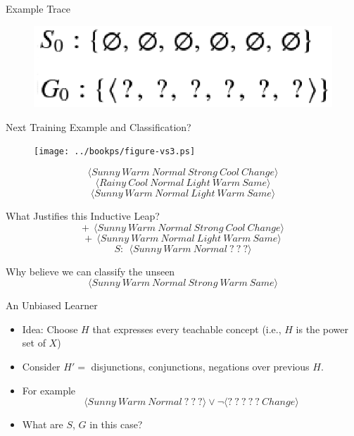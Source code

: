 \documentclass[%
pdf,
colorBG,
slideColor,
tcrico,
]{prosper}
\begin{document}
\begin{slide}{Example Trace}
\begin{figure}
	\centering
	\includegraphics[scale=0.4]{exampleTrace.eps}
\end{figure}
\end{slide}


\begin{slide}{Next Training Example and Classification?}
\begin{figure}
	\centering
	\texttt{[image: ../bookps/figure-vs3.ps]}
\end{figure}
\small
\[ \langle Sunny\ Warm\ Normal\ Strong\ Cool\ Change \rangle \]
\[ \langle Rainy\ Cool\ Normal\ Light\ Warm\ Same \rangle \]
\[ \langle Sunny\ Warm\ Normal\ Light\ Warm\ Same \rangle \]

\end{slide}


\begin{slide}{What Justifies this Inductive Leap?}
\[+\ \  \langle Sunny\ Warm\ Normal\ Strong\ Cool\ Change \rangle \]
\[+\ \  \langle Sunny\ Warm\ Normal\ Light\ Warm\ Same \rangle \]
\[S:\ \  \langle Sunny\ Warm\ Normal\ ?\ ?\ ? \rangle \]

Why believe we can classify the unseen
\[ \langle Sunny\ Warm\ Normal\ Strong\ Warm\ Same \rangle \]
\end{slide}


\begin{slide}{An Unbiased Learner}
\begin{itemize}
	\item  Idea: Choose $H$ that expresses every teachable concept (i.e., $H$ is the power
set of $X$)
\item Consider $H' =$ disjunctions, conjunctions, negations over previous $H$.
\item For example \[  \langle Sunny\ Warm\ Normal\ ?\ ?\ ? \rangle  \vee  \neg \langle ?\ ?\ ?\ ?\ ?\ Change \rangle   \]
\item What are $S$, $G$ in this case?
\end{itemize}
\end{slide}
\end{document}
